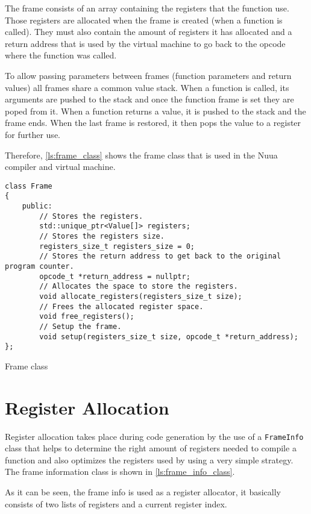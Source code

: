 The frame consists of an array containing the registers that the function use. Those registers are allocated when the frame is created (when a function is called).
They must also contain the amount of registers it has allocated and a return address that is used by the virtual machine to go back to the opcode where the function was called.

To allow passing parameters between frames (function parameters and return values) all frames share a common value stack. When a function is called, its arguments
are pushed to the stack and once the function frame is set they are poped from it. When a function returns a value, it is pushed to the stack and the frame ends.
When the last frame is restored, it then pops the value to a register for further use.

Therefore, \autoref{ls:frame_class} shows the frame class that is used in the Nuua compiler and virtual machine.

\begin{listing}[H]
\begin{verbatim}
class Frame
{
    public:
        // Stores the registers.
        std::unique_ptr<Value[]> registers;
        // Stores the registers size.
        registers_size_t registers_size = 0;
        // Stores the return address to get back to the original program counter.
        opcode_t *return_address = nullptr;
        // Allocates the space to store the registers.
        void allocate_registers(registers_size_t size);
        // Frees the allocated register space.
        void free_registers();
        // Setup the frame.
        void setup(registers_size_t size, opcode_t *return_address);
};
\end{verbatim}
\caption{Frame class}
\label{ls:frame_class}
\end{listing}

\section{Register Allocation}

Register allocation takes place during code generation by the use of a \texttt{FrameInfo} class that helps to determine the right amount of registers needed
to compile a function and also optimizes the registers used by using a very simple strategy. The frame information class is shown in \autoref{ls:frame_info_class}.

As it can be seen, the frame info is used as a register allocator, it basically consists of two lists of registers and a current register index.

